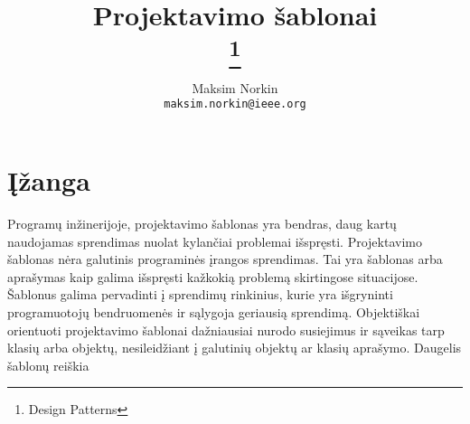 \documentclass[10pt]{IEEEtran}
\author{Maksim Norkin\\ \texttt{maksim.norkin@ieee.org}}
\title{Projektavimo šablonai \\ \footnote{Design Patterns}}
\begin{document}
	\maketitle

	\section{Įžanga}

		Programų inžinerijoje, projektavimo šablonas yra bendras, daug kartų naudojamas sprendimas nuolat kylančiai problemai išspręsti. Projektavimo šablonas nėra galutinis programinės įrangos sprendimas. Tai yra šablonas arba aprašymas kaip galima išspręsti kažkokią problemą skirtingose situacijose. Šablonus galima pervadinti į sprendimų rinkinius, kurie yra išgryninti programuotojų bendruomenės ir sąlygoja geriausią sprendimą. Objektiškai orientuoti projektavimo šablonai dažniausiai nurodo susiejimus ir sąveikas tarp klasių arba objektų, nesileidžiant į galutinių objektų ar klasių aprašymo. Daugelis šablonų reiškia 
\end{document}

